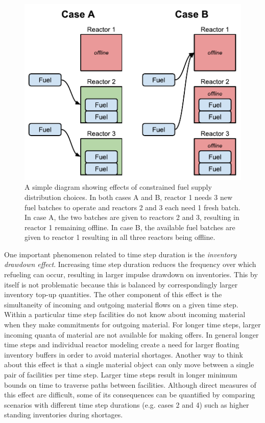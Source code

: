 \documentclass{style}
\begin{document}
\begin{figure}[h]
    \centering
    \includegraphics[width=0.8\columnwidth]{exp2/fuel-sharing.pdf}
    \caption[The fuel sharing effect]{
        A simple diagram showing effects of constrained fuel supply
        distribution choices. In both cases A and B, reactor 1 needs 3 new
        fuel batches to operate and reactors 2 and 3 each need 1 fresh batch.
        In case A, the two batches are given to reactors 2 and 3, resulting in
        reactor 1 remaining offline. In case B, the available fuel batches are
        given to reactor 1 resulting in all three reactors being offline.
    }
    \label{fig:fuel-sharing}
\end{figure}

One important phenomenon related to time step duration is the \emph{inventory
drawdown effect}.  Increasing time step duration reduces the frequency over
which refueling can occur, resulting in larger impulse drawdown on
inventories. This by itself is not problematic because this is balanced by
correspondingly larger inventory top-up quantities.  The other component of
this effect is the simultaneity of incoming and outgoing material flows on a
given time step.  Within a particular time step facilities do not know about
incoming material when they make commitments for outgoing material.  For
longer time steps, larger incoming quanta of material are not available for
making offers. In general longer time steps and individual reactor modeling
create a need for larger floating inventory buffers in order to avoid material
shortages.  Another way to think about this effect is that a single material
object can only move between a single pair of facilities per time step. Larger
time steps result in longer minimum bounds on time to traverse paths between
facilities. Although direct measures of this effect are difficult, some of its
consequences can be quantified by comparing scenarios with different time step
durations (e.g. cases 2 and 4) such as higher standing inventories during
shortages.  
\end{document}
